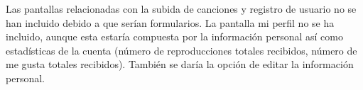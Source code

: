 \vspace{1cm}
Las pantallas relacionadas con la subida de canciones y registro de usuario no se han incluido debido a que serían formularios.
La pantalla mi perfil no se ha incluido, aunque esta estaría compuesta por la información personal así como estadísticas de la cuenta (número de reproducciones totales recibidos, número de me gusta totales recibidos). También se daría la opción de editar la información personal.
